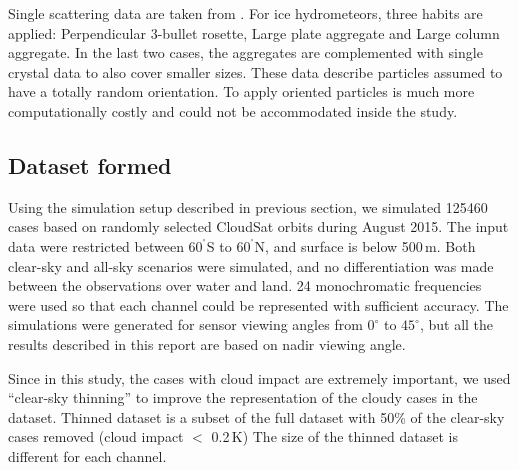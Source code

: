 \documentclass[12pt]{article}
\newcommand{\degree}{\ensuremath{\mathrm{^\circ}}}
\begin{document}
Single scattering data are taken from \citet{eriksson:agene:18}. For ice
hydrometeors, three habits are applied: Perpendicular 3-bullet rosette, Large
plate aggregate and Large column aggregate. In the last two cases, the
aggregates are complemented with single crystal data to also cover smaller
sizes. These data describe particles assumed to have a totally random
orientation. To apply oriented particles is much more computationally costly
and could not be accommodated inside the study.


\subsection{Dataset formed}
%
Using the simulation setup described in previous section, we simulated 125460 cases based on randomly selected CloudSat orbits during August 2015. The input data
were restricted between $60^{\degree}$S to $60^{\degree}$N, and surface is below 500\,m. Both clear-sky and all-sky scenarios were simulated, and no differentiation was made between the observations over water and land. 24 monochromatic frequencies were used so that each channel could be represented with sufficient accuracy. The simulations were generated for sensor viewing angles from $0^\circ$ to $45^\circ$, but all the results described in this report are based on nadir viewing angle.

Since in this study, the cases with cloud impact are extremely important, we used ``clear-sky thinning'' to improve the representation of the cloudy cases in the dataset. Thinned dataset is a subset of the full dataset with 50\% of the clear-sky cases removed (cloud impact $<$ 0.2\,K) The size of the thinned dataset is different for each channel. 
\end{document}
